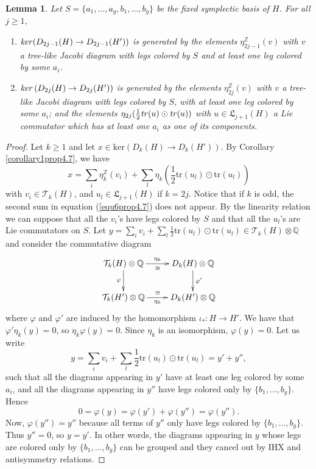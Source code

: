 \documentclass[10pt]{amsart}
\numberwithin{equation}{section}
\numberwithin{equation}{section}
\newtheorem{lemma}[theorem]{Lemma}
\theoremstyle{definition}
\begin{document}
\begin{lemma}\label{lemma1prop4.7}
Let $S=\{a_1,\ldots,a_g,b_1,\ldots, b_g\}$ be the fixed symplectic basis of $H$. For all $j\geq 1$,
\begin{enumerate}
\item[\emph{(\emph{i})}] $\text{\emph{ker}}(D_{2j-1}(H)\rightarrow D_{2j-1}(H'))$ is generated by the elements $\eta^{\mathbb{Z}}_{2j-1}(v)$ with $v$ a tree-like Jacobi diagram with legs colored by $S$ and at least one leg colored by some $a_i$.
\item[\emph{(\emph{ii})}] $\text{\emph{ker}}\left(D_{2j}(H)\rightarrow D_{2j}(H')\right)$ is generated by the elements $\eta^{\mathbb{Z}}_{2j}(v)$ with $v$ a tree-like Jacobi diagram with legs colored by $S$, with at least one leg colored by some $a_i$; and the elements $\eta_{2j}(\frac{1}{2}\text{\emph{tr}}(u)\odot\text{\emph{tr}}(u))$ with $u\in\mathfrak{L}_{j+1}(H)$ a Lie commutator which  has at least one $a_i$ as one of its components.
\end{enumerate}
\end{lemma}
\begin{proof} Let $k\geq 1$ and let $x\in\text{ker}(D_k(H)\rightarrow D_k(H'))$. By Corollary \ref{corollary1prop4.7}, we have
\begin{equation}\label{equ6prop4.7}
x=\sum_i\eta^{\mathbb{Z}}_k(v_i)+\sum_l\eta_k\left(\frac{1}{2}\text{tr}(u_l)\odot \text{tr}(u_l)\right)
\end{equation}
with $v_i\in\mathcal{T}_k(H)$, and $u_l\in\mathfrak{L}_{j+1}(H)$ if $k=2j$. Notice that if $k$ is odd, the second sum in equation (\ref{equ6prop4.7}) does not appear. By the linearity relation  we can suppose that all the $v_i$'s have legs colored by $S$ and that all the $u_l$'s are Lie commutators on $S$.  Let $y=\sum_i v_i+\sum_l\frac{1}{2}\text{tr}(u_l)\odot\text{tr}(u_l)\in\mathcal{T}_k(H)\otimes\mathbb{Q}$ and consider the commutative diagram
\begin{equation}\label{equ7prop4.7}
\xymatrix{  \mathcal{T}_k(H)\otimes\mathbb{Q}\ar[r]^-{\eta_k}_-{\cong}\ar[d]_-{\varphi} &D_k(H)\otimes\mathbb{Q} \ar[d]^-{\varphi'}\\
					\mathcal{T}_k(H')\otimes\mathbb{Q}\ar[r]_-{\eta_k}^-{\cong}&D_k(H')\otimes\mathbb{Q}}
\end{equation}
where $\varphi$ and $\varphi'$ are induced by the homomorphism $\iota_*:H\rightarrow H'$. We have that $\varphi'\eta_k(y)=0$, so $\eta_k\varphi(y)=0$. Since $\eta_k$ is an isomorphism, $\varphi(y)=0$. Let us write
 $$y=\sum_i v_i+\sum_l\frac{1}{2}\text{tr}(u_l)\odot\text{tr}(u_l)=y'+y'',$$
such that  all the diagrams appearing in $y'$ have at least one leg colored by some $a_i$, and   all the diagrams appearing in $y''$ have legs colored only by $\{b_1,\ldots, b_g\}$. Hence
$$0=\varphi(y)=\varphi(y')+\varphi(y'')=\varphi(y'').$$
Now, $\varphi(y'')=y''$ because all terms of $y''$ only have legs colored by $\{b_1,\ldots,b_g\}$. Thus $y''=0$, so $y=y'$. In other words, the diagrams appearing in $y$ whose legs are colored only by $\{b_1,\ldots,b_g\}$ can be grouped and they cancel out by  IHX and antisymmetry relations.
\end{proof}
\end{document}
